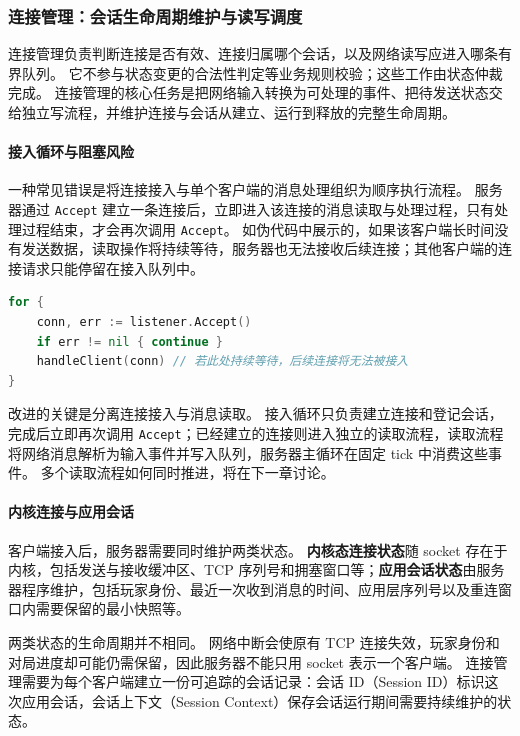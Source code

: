 \subsubsection{连接管理：会话生命周期维护与读写调度}\label{sec2:connection-management}

连接管理负责判断连接是否有效、连接归属哪个会话，以及网络读写应进入哪条有界队列。
它不参与状态变更的合法性判定等业务规则校验；这些工作由状态仲裁完成。
连接管理的核心任务是把网络输入转换为可处理的事件、把待发送状态交给独立写流程，并维护连接与会话从建立、运行到释放的完整生命周期。

\paragraph{接入循环与阻塞风险}
一种常见错误是将连接接入与单个客户端的消息处理组织为顺序执行流程。
服务器通过 \texttt{Accept} 建立一条连接后，立即进入该连接的消息读取与处理过程，只有处理过程结束，才会再次调用 \texttt{Accept}。
如伪代码中展示的，如果该客户端长时间没有发送数据，读取操作将持续等待，服务器也无法接收后续连接；其他客户端的连接请求只能停留在接入队列中。

\begin{tcolorbox}[title=阻塞式连接处理的反例]
\begin{lstlisting}[style=codeblock, language=go]
for {
    conn, err := listener.Accept()
    if err != nil { continue }
    handleClient(conn) // 若此处持续等待，后续连接将无法被接入
}
\end{lstlisting}
\end{tcolorbox}

改进的关键是分离连接接入与消息读取。
接入循环只负责建立连接和登记会话，完成后立即再次调用 \texttt{Accept}；已经建立的连接则进入独立的读取流程，读取流程将网络消息解析为输入事件并写入队列，服务器主循环在固定 tick 中消费这些事件。
多个读取流程如何同时推进，将在下一章讨论。

\paragraph{内核连接与应用会话}
客户端接入后，服务器需要同时维护两类状态。
\textbf{内核态连接状态}随 socket 存在于内核，包括发送与接收缓冲区、TCP 序列号和拥塞窗口等；\textbf{应用会话状态}由服务器程序维护，包括玩家身份、最近一次收到消息的时间、应用层序列号以及重连窗口内需要保留的最小快照等。

两类状态的生命周期并不相同。
网络中断会使原有 TCP 连接失效，玩家身份和对局进度却可能仍需保留，因此服务器不能只用 socket 表示一个客户端。
连接管理需要为每个客户端建立一份可追踪的会话记录：会话 ID（Session ID）标识这次应用会话，会话上下文（Session Context）保存会话运行期间需要持续维护的状态。

